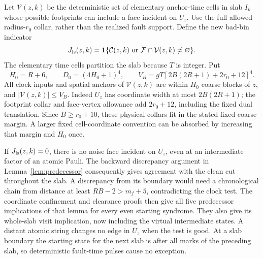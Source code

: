 Let \(\mathcal V(z,k)\) be the deterministic set of elementary
anchor-time cells in slab \(I_k\) whose possible footprints can
include a face incident on \(U_z\). Use the full allowed
radius-\(r_0\) collar, rather than the realized fault support.
Define the new bad-bin indicator
\begin{equation}\label{eq:correlated-bad}
 J_{\rm ls}(z,k)=
 \mathbf1\{\mathcal C(z,k)\ \text{or}\
                      \mathcal F\cap\mathcal V(z,k)\ne\varnothing\}.
\end{equation}
The elementary time cells partition the slab because \(T\) is
integer. Put
\begin{equation}\label{eq:envelope-size}
 H_0=R+6,\qquad D_0=(4H_0+1)^4,\qquad
 V_B=gT\left\lceil2B(2R+1)+2r_0+12\right\rceil^4.
\end{equation}
All clock inputs and spatial anchors of \(\mathcal V(z,k)\)
are within \(H_0\) coarse blocks of \(z\), and
\(|\mathcal V(z,k)|\le V_B\). Indeed \(U_z\) has coordinate
width at most \(2B(2R+1)\); the footprint collar and face-vertex
allowance add \(2r_0+12\), including the fixed dual translation.
Since \(B\ge r_0+10\), these physical collars fit in the stated
fixed coarse margin. A larger fixed cell-coordinate convention
can be absorbed by increasing that margin and \(H_0\) once.

If \(J_{\rm ls}(z,k)=0\), there is no noise face incident on
\(U_z\), even at an intermediate factor of an atomic Pauli.
The backward discrepancy argument in
Lemma~\ref{lem:predecessor} consequently gives agreement with
the clean cut throughout the slab. A discrepancy from its
boundary would need a chronological chain from distance at
least \(RB-2>m_f+5\), contradicting the clock test.
The coordinate confinement and clearance proofs then give all
five predecessor implications of that lemma for every even
starting syndrome. They also give its whole-slab visit
implication, now including the virtual intermediate states.
A distant atomic string changes no edge in \(U_z\) when the
test is good. At a slab boundary the starting state for the
next slab is after all marks of the preceding slab, so
deterministic fault-time pulses cause no exception.

